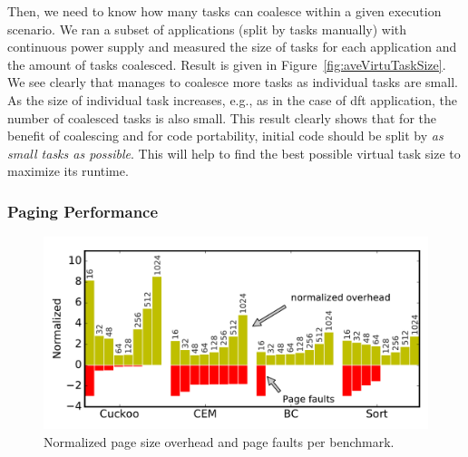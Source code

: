 Then, we need to know how many tasks \sys can coalesce within a given execution scenario. We ran a subset of applications (split by tasks manually) with continuous power supply and measured the size of tasks for each application and the amount of tasks coalesced. Result is given in Figure~\ref{fig:aveVirtuTaskSize}. We see clearly that \sys manages to coalesce more tasks as individual tasks are small. As the size of individual task increases, e.g., as in the case of dft application, the number of coalesced tasks is also small. This result clearly shows that for the benefit of coalescing and for code portability, initial code should be split by \emph{as small tasks as possible}. This will help \sys to find the best possible virtual task size to maximize its runtime.

\subsubsection{\sys Paging Performance}
\label{sec:results_memory_management}

\begin{figure}
	\centering
	\includegraphics[width=\columnwidth]{figures/pagSizeOverhead}
	\caption{Normalized page size overhead and page faults per benchmark.}
	\label{fig:IPOSPerformance}
	\label{fig:page_size}
\end{figure}

